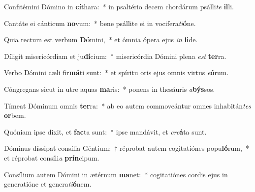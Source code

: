 \item Confitémini Dómino in \textbf{cí}thara:~* in psaltério decem chordárum psálli\textit{te} \textbf{il}li.
\item Cantáte ei cánticum \textbf{no}vum:~* bene psállite ei in vocifera\textit{ti}\textbf{ó}ne.
\item Quia rectum est verbum \textbf{Dó}mini,~* et ómnia ópera ejus \textit{in} \textbf{fi}de.
\item Díligit misericórdiam et ju\textbf{dí}cium:~* misericórdia Dómini plena \textit{est} \textbf{ter}ra.
\item Verbo Dómini cæli fir\textbf{má}ti sunt:~* et spíritu oris ejus omnis virtus \textit{e}\textbf{ó}rum.
\item Cóngregans sicut in utre aquas \textbf{ma}ris:~* ponens in thesáuris \textit{a}\textbf{býs}sos.
\item Tímeat Dóminum omnis \textbf{ter}ra:~* ab eo autem commoveántur omnes inhabitán\textit{tes} \textbf{or}bem.
\item Quóniam ipse dixit, et \textbf{fac}ta sunt:~* ipse mandávit, et \textit{cre}\textbf{á}ta sunt.
\item Dóminus díssipat consília Géntium:~† réprobat autem cogitatiónes popu\textbf{ló}rum,~* et réprobat consíli\textit{a} \textbf{prín}cipum.
\item Consílium autem Dómini in ætérnum \textbf{ma}net:~* cogitatiónes cordis ejus in generatióne et genera\textit{ti}\textbf{ó}nem.

